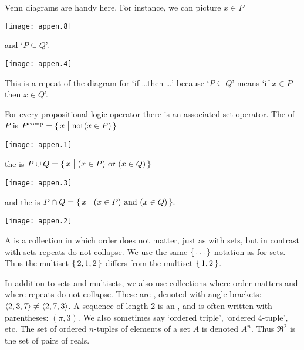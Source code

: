 Venn diagrams are handy here.
For instance, we can picture \( x\in P \) 
\begin{center}
  \texttt{[image: appen.8]}
\end{center}
and `\( P\subseteq Q \)'.
\begin{center}
  \texttt{[image: appen.4]}
\end{center}
\noindent
This is a repeat of the diagram for `if \ldots then \ldots' 
because `\( P\subseteq Q \)' means 
`if \( x\in P \) then \( x\in Q \)'.

For every propositional logic operator there is an associated set
operator.
The 
of \( P \) is
\( P^{\text{comp}}=\mbox{$\{\,x\bigm| \text{not$( x\in P)$}\,\}$} \)
\begin{center}
  \texttt{[image: appen.1]}
\end{center}
\noindent
the  is
\( P\cup Q=\mbox{$\{\,x\bigm| \text{$(x\in P)$ or $(x\in Q)$}\,\}$} \)
\begin{center}
  \texttt{[image: appen.3]}
\end{center}
and the  is
\( P\cap Q=\mbox{$\{\,x\bigm| \text{$(x\in P)$ and $(x\in Q)$}\,\}$}. \)
\begin{center}
  \texttt{[image: appen.2]}
\end{center}


A 
is a collection in which order does not matter,
just as with sets,
but in contrast with sets repeats do not collapse.
We use the same $\mbox{$\{\,\ldots\,\}$}$ notation as for sets.
Thus the multiset $\mbox{$\{\,2,1,2\,\}$}$ differs from the multiset
$\mbox{$\{\,1,2\,\}$}$. 



In addition to sets and multisets,
we also use collections where order matters and where repeats do
not collapse.
These are , denoted with angle brackets:
\( \langle 2,3,7\rangle\neq\langle2,7,3\rangle \).
A sequence of length \( 2 \) is an 
,
and is often written with parentheses: \( (\pi,3) \).
We also sometimes say `ordered triple', `ordered \( 4 \)-tuple', etc.
The set of ordered \( n \)-tuples of elements of a set \( A \) is denoted
\( A^n \).
Thus \( \Re^2 \) is the set of pairs of reals.




